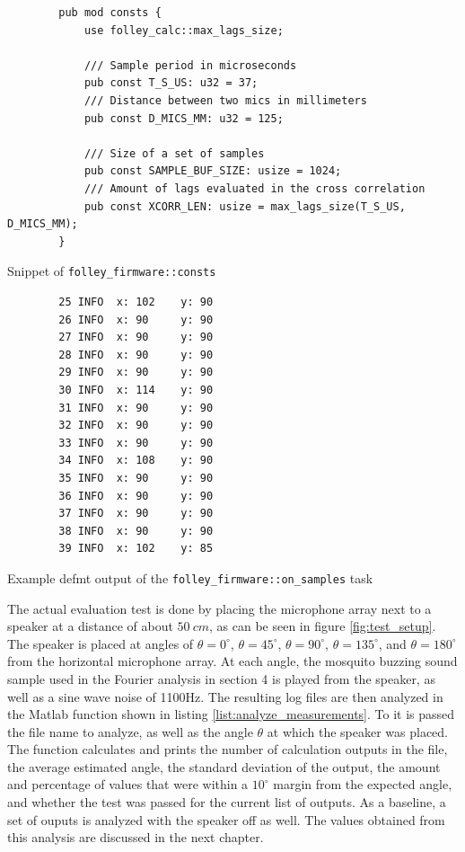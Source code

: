 \documentclass[a4paper]{article}
\newcommand{\rust}[1]{\texttt{#1}}
\begin{document}
\begin{listing}[H]
    \begin{verbatim}
        pub mod consts {
            use folley_calc::max_lags_size;

            /// Sample period in microseconds
            pub const T_S_US: u32 = 37;
            /// Distance between two mics in millimeters
            pub const D_MICS_MM: u32 = 125;

            /// Size of a set of samples
            pub const SAMPLE_BUF_SIZE: usize = 1024;
            /// Amount of lags evaluated in the cross correlation
            pub const XCORR_LEN: usize = max_lags_size(T_S_US, D_MICS_MM);
        }
    \end{verbatim}
    \caption{Snippet of \rust{folley_firmware::consts}}
    \label{list:consts}
\end{listing}

\begin{listing}[H]
    \begin{verbatim}
        25 INFO  x: 102    y: 90
        26 INFO  x: 90     y: 90
        27 INFO  x: 90     y: 90
        28 INFO  x: 90     y: 90
        29 INFO  x: 90     y: 90
        30 INFO  x: 114    y: 90
        31 INFO  x: 90     y: 90
        32 INFO  x: 90     y: 90
        33 INFO  x: 90     y: 90
        34 INFO  x: 108    y: 90
        35 INFO  x: 90     y: 90
        36 INFO  x: 90     y: 90
        37 INFO  x: 90     y: 90
        38 INFO  x: 90     y: 90
        39 INFO  x: 102    y: 85
    \end{verbatim}
    \caption{Example defmt output of the \rust{folley_firmware::on_samples} task}
    \label{list:defmt_output}
\end{listing}

The actual evaluation test is done by placing the microphone array next to a speaker at a distance of about $50\ cm$, as can be seen in figure \ref{fig:test_setup}. The speaker is placed at angles of $\theta = 0^{\circ}$, $\theta = 45^{\circ}$, $\theta = 90^{\circ}$, $\theta = 135^{\circ}$, and $\theta = 180^{\circ}$ from the horizontal microphone array. At each angle, the mosquito buzzing sound sample used in the Fourier analysis in section 4 is played from the speaker, as well as a sine wave noise of 1100Hz. The resulting log files are then analyzed in the Matlab function shown in listing \ref{list:analyze_measurements}. To it is passed the file name to analyze, as well as the angle $\theta$ at which the speaker was placed. The function calculates and prints the number of calculation outputs in the file, the average estimated angle, the standard deviation of the output, the amount and percentage of values that were within a $10^{\circ}$ margin from the expected angle, and whether the test was passed for the current list of outputs. As a baseline, a set of ouputs is analyzed with the speaker off as well. The values obtained from this analysis are discussed in the next chapter.
\end{document}
